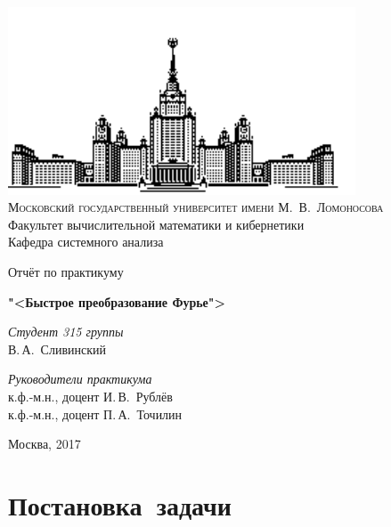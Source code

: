 \documentclass[11pt, oneside, final]{article}
\numberwithin{equation}{section}
\begin{document}
    \thispagestyle{empty}
    \begin{center}
        \ \vspace{-3cm}
    
        \includegraphics[width=0.5
        \textwidth]{msu}\\
        {\scshape Московский государственный университет имени М.~В.~Ломоносова}\\
        Факультет вычислительной математики и кибернетики\\
        Кафедра системного анализа
    
        \vfill
    
        {\LARGE Отчёт по практикуму}
    
        \vspace{1cm}
    
        {\Huge\bfseries "<Быстрое преобразование Фурье">} 
    \end{center}

    \vspace{1cm}
    \begin{flushright}
        \large \textit{Студент 315 группы}\\
        В.\,А.~Сливинский
    
        \vspace{5mm}
    
        \textit{Руководители практикума}\\
        к.ф.-м.н., доцент И.\,В.~Рублёв \\
        к.ф.-м.н., доцент П.\,А.~Точилин 
    \end{flushright}

    \vfill
    \begin{center}
        Москва, 2017 
    \end{center}
    \pagebreak

    \tableofcontents

    \pagebreak



    \section{Постановка~задачи}
\end{document}
